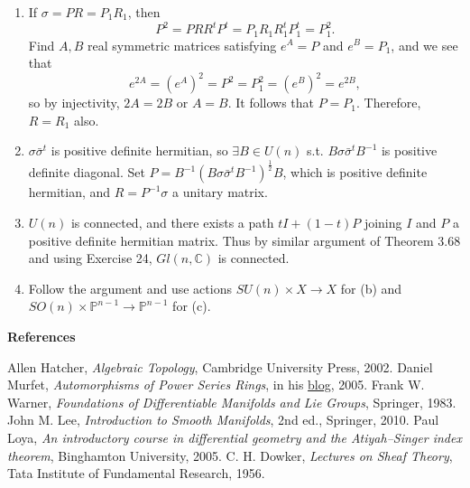 \begin{enumerate}
For a real symmetric $A$, $e^{A}$ is positive definite hermitian by above and real, 
so positive definite symmetric. Injectivity is explained above. 
For a positive definite symmetric matrix $H$, we can find $B \in O(n)$ as (a), 
and there exists a real diagonal matrix $A$ s.t. $e^{A}=BHB^{-1}$. 
Then note that $e^{B^{-1}AB}=H$ and $B^{-1}AB$ is real symmetric.
\item If $\sigma=P R=P_{1} R_{1}$, then
\[P^{2}=P R R^{t} P^{t}=P_{1} R_{1} R_{1}^{t} P_{1}^{t}=P_{1}^{2}.\]
Find $A, B$ real symmetric matrices satisfying $e^{A}=P$ and $e^{B}=P_{1}$, and we see that
\[e^{2A}=(e^{A})^{2}=P^{2}=P_{1}^{2}=(e^{B})^{2}=e^{2B},\]
so by injectivity, $2 A=2 B$ or $A=B$. It follows that $P=P_{1}$. Therefore, $R=R_{1}$ also.
\item $\sigma \bar{\sigma}^{t}$ is positive definite hermitian, 
so $\exists B \in U(n)$ s.t. $B \sigma \bar{\sigma}^{t} B^{-1}$ is positive definite diagonal. 
Set $P=B^{-1}(B \sigma \bar{\sigma}^{t} B^{-1})^{\frac{1}{2}} B$, 
which is positive definite hermitian, and $R=P^{-1} \sigma$ a unitary matrix.
\item $U(n)$ is connected, and there exists a path $tI+(1-t)P$ joining $I$ and $P$ a positive definite hermitian matrix. 
Thus by similar argument of Theorem 3.68 and using Exercise 24, $Gl(n, \mathbb{C})$ is connected.
\item Follow the argument and use actions $SU(n) \times X \rightarrow X$ for (b) and $SO(n) \times \mathbb{P}^{n-1} \rightarrow \mathbb{P}^{n-1}$ for (c).
\end{enumerate}
\textbf{References}
\begin{references}
 Allen Hatcher, \textit{Algebraic Topology}, Cambridge University Press, 2002.
 Daniel Murfet, \textit{Automorphisms of Power Series Rings}, in his \href{http://therisingsea.org}{blog}, 2005.
 Frank W. Warner, \textit{Foundations of Differentiable Manifolds and Lie Groups}, Springer, 1983.
 John M. Lee, \textit{Introduction to Smooth Manifolds}, 2nd ed., Springer, 2010.
 Paul Loya, \textit{An introductory course in differential geometry and the Atiyah--Singer index theorem}, Binghamton University, 2005.
 C. H. Dowker, \textit{Lectures on Sheaf Theory}, Tata Institute of Fundamental Research, 1956.
\end{references}